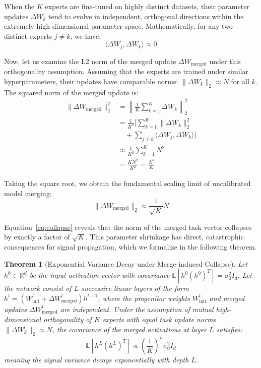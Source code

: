 \documentclass{article}
\theoremstyle{plain}
\newtheorem{theorem}{Theorem}[section]
\theoremstyle{definition}
\theoremstyle{remark}
\begin{document}
When the $K$ experts are fine-tuned on highly distinct datasets, their parameter updates $\Delta W_k$ tend to evolve in independent, orthogonal directions within the extremely high-dimensional parameter space. Mathematically, for any two distinct experts $j \neq k$, we have:
\begin{equation}
\langle \Delta W_j, \Delta W_k \rangle \approx 0
\end{equation}

Now, let us examine the L2 norm of the merged update $\Delta W_{\text{merged}}$ under this orthogonality assumption. Assuming that the experts are trained under similar hyperparameters, their updates have comparable norms: $\|\Delta W_k\|_2 \approx N$ for all $k$. The squared norm of the merged update is:
\begin{equation}
\begin{aligned}
\|\Delta W_{\text{merged}}\|_2^2 &= \left\| \frac{1}{K} \sum_{k=1}^K \Delta W_k \right\|_2^2 \\
&= \frac{1}{K^2} \Big[ \sum_{k=1}^K \|\Delta W_k\|_2^2 \\
&\quad + \sum_{j \neq k} \langle \Delta W_j, \Delta W_k \rangle \Big] \\
&\approx \frac{1}{K^2} \sum_{k=1}^K N^2 \\
&= \frac{K N^2}{K^2} = \frac{N^2}{K}
\end{aligned}
\end{equation}

Taking the square root, we obtain the fundamental scaling limit of uncalibrated model merging:
\begin{equation}
\label{eq:collapse}
\|\Delta W_{\text{merged}}\|_2 \approx \frac{1}{\sqrt{K}} N
\end{equation}

Equation~\ref{eq:collapse} reveals that the norm of the merged task vector collapses by exactly a factor of $\sqrt{K}$. This parameter shrinkage has direct, catastrophic consequences for signal propagation, which we formalize in the following theorem.

\begin{theorem}[Exponential Variance Decay under Merge-induced Collapse]
\label{thm:decay}
Let $h^0 \in \mathbb{R}^d$ be the input activation vector with covariance $\mathbb{E}[h^0 (h^0)^T] = \sigma_0^2 I_d$. Let the network consist of $L$ successive linear layers of the form $h^{l} = \left(W_{\text{init}}^l + \Delta W_{\text{merged}}^l\right) h^{l-1}$, where the progenitor weights $W_{\text{init}}^l$ and merged updates $\Delta W_{\text{merged}}^l$ are independent. Under the assumption of mutual high-dimensional orthogonality of $K$ experts with equal task update norms $\|\Delta W^l_k\|_2 \approx N$, the covariance of the merged activations at layer $L$ satisfies:
\begin{equation}
\mathbb{E}[h^L (h^L)^T] \propto \left(\frac{1}{K}\right)^L \sigma_0^2 I_d
\end{equation}
meaning the signal variance decays exponentially with depth $L$.
\end{theorem}
\end{document}
